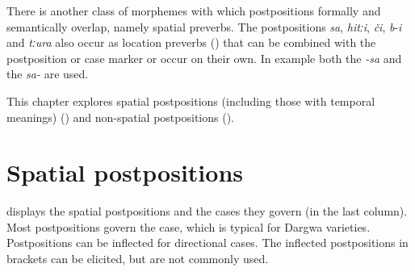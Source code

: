 There is another class of morphemes with which postpositions formally and semantically overlap, namely spatial preverbs. The postpositions \textit{sa}, \textit{hitːi}, \textit{či}, \textit{b}-\textit{i} and \textit{tːura} also occur as location preverbs () that can be combined with the postposition or case marker or occur on their own. In example  both the  \textit{-sa} and the  \textit{sa-} are used.

This chapter explores spatial postpositions (including those with temporal meanings) () and non-spatial postpositions (). 


\section{Spatial postpositions}
\label{sec:Spatialpostpositions}

 displays the spatial postpositions and the cases they govern (in the last column). Most postpositions govern the  case, which is typical for Dargwa varieties. Postpositions can be inflected for directional cases. The inflected postpositions in brackets can be elicited, but are not commonly used.

